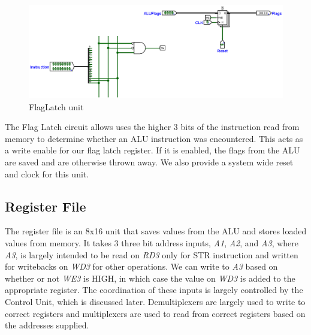 \documentclass[12pt, letter]{article}
\begin{document}
	\begin{figure}[h]
		\centering
		\includegraphics[scale = 0.3]{FlagLatch}
		\caption{FlagLatch unit}
		\label{fig:FlagLatch}
	\end{figure}

	The Flag Latch circuit allows uses the higher 3 bits of the instruction read from memory to determine whether an ALU instruction was encountered. This acts as a write enable for our flag latch register. If it is enabled, the flags from the ALU are saved and are otherwise thrown away. We also provide a system wide reset and clock for this unit. 
	\newpage
	
	\subsection{Register File}
	
	The register file is an 8x16 unit that saves values from the ALU and stores loaded values from memory. It takes 3 three bit address inputs, \textit{A1}, \textit{A2}, and \textit{A3}, where \textit{A3}, is largely intended to be read on \textit{RD3} only for STR instruction and written for writebacks  on \textit{WD3} for other operations. We can write to \textit{A3} based on whether or not \textit{WE3} is HIGH, in which case the value on \textit{WD3} is added to the appropriate register. The coordination of these inputs is largely controlled by the Control Unit, which is discussed later. Demultiplexers are largely used to write to correct registers and multiplexers are used to read from correct registers based on the addresses supplied.
	\bigskip
	
\end{document}
